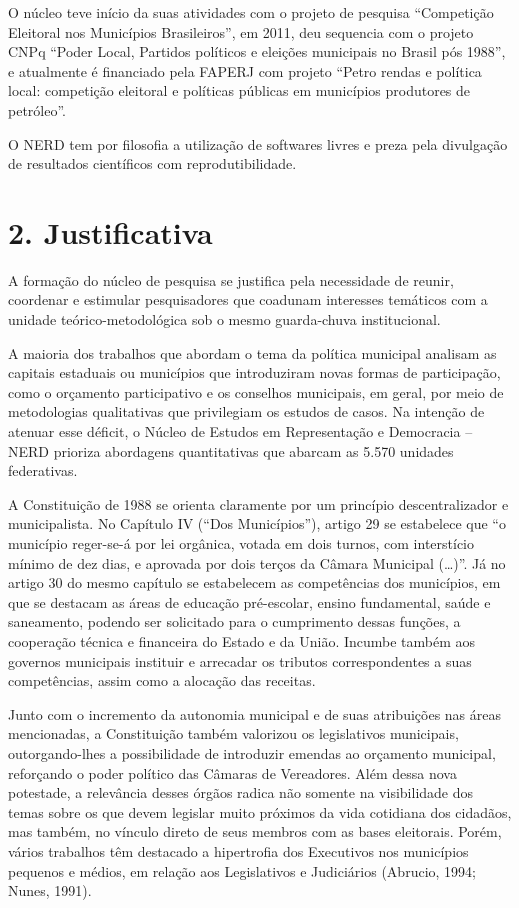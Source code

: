 \documentclass[
  12pt,
]{report}
\begin{document}
O núcleo teve início da suas atividades com o projeto de pesquisa
``Competição Eleitoral nos Municípios Brasileiros'', em 2011, deu
sequencia com o projeto CNPq ``Poder Local, Partidos políticos e
eleições municipais no Brasil pós 1988'', e atualmente é financiado pela
FAPERJ com projeto ``Petro rendas e política local: competição eleitoral
e políticas públicas em municípios produtores de petróleo''.

O NERD tem por filosofia a utilização de softwares livres e preza pela
divulgação de resultados científicos com reprodutibilidade.

\hypertarget{justificativa}{%
\section{2. Justificativa}\label{justificativa}}

A formação do núcleo de pesquisa se justifica pela necessidade de
reunir, coordenar e estimular pesquisadores que coadunam interesses
temáticos com a unidade teórico-metodológica sob o mesmo guarda-chuva
institucional.

A maioria dos trabalhos que abordam o tema da política municipal
analisam as capitais estaduais ou municípios que introduziram novas
formas de participação, como o orçamento participativo e os conselhos
municipais, em geral, por meio de metodologias qualitativas que
privilegiam os estudos de casos. Na intenção de atenuar esse déficit, o
Núcleo de Estudos em Representação e Democracia -- NERD prioriza
abordagens quantitativas que abarcam as 5.570 unidades federativas.

A Constituição de 1988 se orienta claramente por um princípio
descentralizador e municipalista. No Capítulo IV (``Dos Municípios''),
artigo 29 se estabelece que ``o município reger-se-á por lei orgânica,
votada em dois turnos, com interstício mínimo de dez dias, e aprovada
por dois terços da Câmara Municipal (\ldots)''. Já no artigo 30 do mesmo
capítulo se estabelecem as competências dos municípios, em que se
destacam as áreas de educação pré-escolar, ensino fundamental, saúde e
saneamento, podendo ser solicitado para o cumprimento dessas funções, a
cooperação técnica e financeira do Estado e da União. Incumbe também aos
governos municipais instituir e arrecadar os tributos correspondentes a
suas competências, assim como a alocação das receitas.

Junto com o incremento da autonomia municipal e de suas atribuições nas
áreas mencionadas, a Constituição também valorizou os legislativos
municipais, outorgando-lhes a possibilidade de introduzir emendas ao
orçamento municipal, reforçando o poder político das Câmaras de
Vereadores. Além dessa nova potestade, a relevância desses órgãos radica
não somente na visibilidade dos temas sobre os que devem legislar muito
próximos da vida cotidiana dos cidadãos, mas também, no vínculo direto
de seus membros com as bases eleitorais. Porém, vários trabalhos têm
destacado a hipertrofia dos Executivos nos municípios pequenos e médios,
em relação aos Legislativos e Judiciários (Abrucio, 1994; Nunes, 1991).
\end{document}
